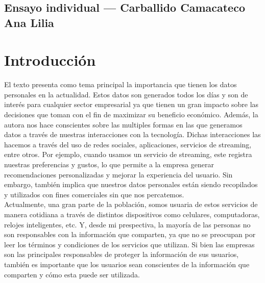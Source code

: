 
%

\subsection*{Ensayo individual — Carballido Camacateco Ana Lilia}

\section*{Introducción}
El texto \cite{datavalue} presenta como tema principal la importancia que tienen los datos personales en la 
actualidad. Estos datos son generados todos los días y son de interés para cualquier sector empresarial ya que
tienen un gran impacto sobre las decisiones que toman con el fin de maximizar su beneficio económico.
Además, la autora nos hace conscientes sobre las multiples formas en las que generamos datos a través de nuestras 
interacciones con la tecnología. Dichas interacciones las hacemos a través del uso de redes sociales, aplicaciones,
servicios de streaming, entre otros. Por ejemplo, cuando usamos un servicio de streaming, este registra nuestras preferencias y gustos, lo que permite
a la empresa generar recomendaciones personalizadas y mejorar la experiencia del usuario. Sin embargo, también
implica que nuestros datos personales están siendo recopilados y utilizados con fines comerciales sin que nos
percatemos. \\
Actualmente, una gran parte de la población, somos usuaria de estos servicios de manera cotidiana a través de distintos
dispositivos como celulares, computadoras, relojes inteligentes, etc. Y, desde mi prespectiva, la mayoría de las
personas no son responsables con la información que comparten, ya que no se preocupan por leer los términos y condiciones de los servicios que utilizan.
Si bien las empresas son las principales responsables de proteger la información de sus usuarios, también es importante
que los usuarios sean conscientes de la información que comparten y cómo esta puede ser utilizada.

\vspace{0.3cm}

